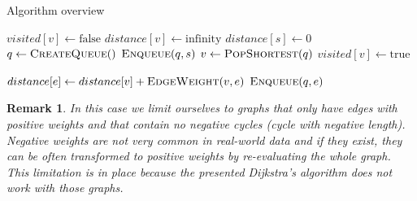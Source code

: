 \documentclass[a4paper,12pt,notitlepage,oneside]{article}
\newtheorem*{remark}{Remark}
\begin{document}
\begin{section}{Algorithm overview}
\begin{algorithm}[H]
\caption{Dijkstra's algorithm}\label{alg:Dijkstra}
\begin{algorithmic}[1]
		\State $visited[v]\gets \text{false}$
		\State $distance[v]\gets \text{infinity}$
	\EndFor
	\State $distance[s]\gets \text{0}$
	\State $q\gets \Call{CreateQueue}$
	\State $\Call{Enqueue}{q, s}$
	\State
			\State $v\gets \Call{PopShortest}{q}$
			\State $visited[v]\gets \text{true}$
			
					\State $distance[e]\gets distance[v] + \Call{EdgeWeight}{v, e}$
					\State $\Call{Enqueue}{q, e}$
				\EndIf
			\EndFor
	\EndWhile
\EndProcedure
\end{algorithmic}
\end{algorithm}

\begin{remark}
In this case we limit ourselves to graphs that only have edges with positive weights and that contain no negative cycles (cycle with negative length).
Negative weights are not very common in real-world data and if they exist, they can be often transformed to positive weights by re-evaluating the whole graph.
This limitation is in place because the presented Dijkstra's algorithm does not work with those graphs.
\end{remark}
\end{section}
\end{document}
